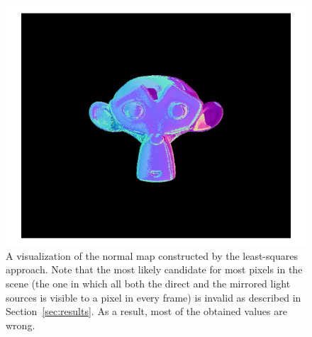 \begin{figure}
  \includegraphics[width=\columnwidth]{images/output-combined}
  \caption{A visualization of the normal map constructed by the least-squares
  approach. Note that the most likely candidate for most pixels in the scene
  (the one in which all both the direct and the mirrored light sources is
  visible to a pixel in every frame) is invalid as described in
  Section~\ref{sec:results}. As a result, most of the obtained values are
  wrong.}\label{fig:output-combined}
\end{figure}

